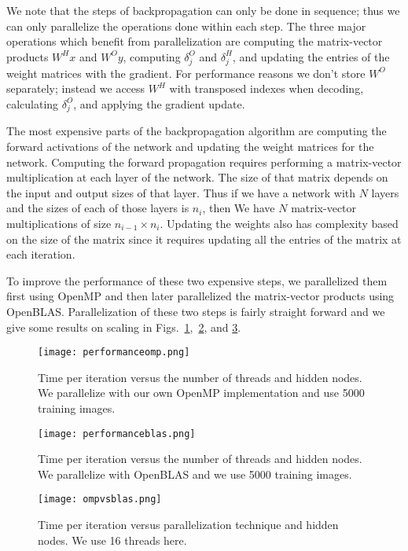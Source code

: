 We note that the steps of backpropagation can only be done in sequence; thus we can only parallelize the operations done within each step. The three major operations which benefit from parallelization are computing the matrix-vector products $W^{H}x$ and $W^{O}y$, computing $\delta^O_j$ and $\delta^H_j$, and updating the entries of the weight matrices with the gradient. For performance reasons we don't store $W^O$ separately; instead we access $W^H$ with transposed indexes when decoding, calculating $\delta^O_j$, and applying the gradient update.

The most expensive parts of the backpropagation algorithm are computing the forward activations of the network and updating the weight matrices for the network. Computing the forward propagation requires performing a matrix-vector multiplication at each layer of the network. The size of that matrix depends on the input and output sizes of that layer. Thus if we have a network with $N$ layers and the sizes of each of those layers is $n_i$, then We have $N$ matrix-vector multiplications of size $n_{i-1} \times n_i$. Updating the weights also has complexity based on the size of the matrix since it requires updating all the entries of the matrix at each iteration.

To improve the performance of these two expensive steps, we parallelized them first using OpenMP and then later parallelized the matrix-vector products using OpenBLAS. Parallelization of these two steps is fairly straight forward and we give some results on scaling in Figs.~\ref{fig:performanceomp},~\ref{fig:performanceblas}, and \ref{fig:ompvsblas}.


\begin{figure}[h]
\centering
\texttt{[image: performanceomp.png]}
\caption{Time per iteration versus the number of threads and hidden nodes. We parallelize with our own OpenMP implementation and use 5000 training images.}
\label{fig:performanceomp}
\end{figure}


\begin{figure}[h]
\centering
\texttt{[image: performanceblas.png]}
\caption{Time per iteration versus the number of threads and hidden nodes. We parallelize with OpenBLAS and we use 5000 training images.}
\label{fig:performanceblas}
\end{figure}

\begin{figure}[h]
\centering
\texttt{[image: ompvsblas.png]}
\caption{Time per iteration versus parallelization technique and hidden nodes. We use 16 threads here.}
\label{fig:ompvsblas}
\end{figure}

